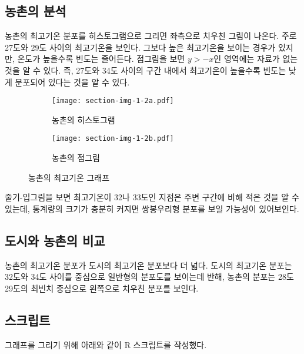 \subsection{농촌의 분석}

농촌의 최고기온 분포를 히스토그램으로 그리면 좌측으로 치우친 그림이 나온다.
주로 27도와 29도 사이의 최고기온을 보인다. 그보다 높은 최고기온을 보이는 경우가 있지만,
온도가 높을수록 빈도는 줄어든다. 점그림을 보면 $y > -x$인 영역에는 자료가 없는
것을 알 수 있다. 즉, 27도와 34도 사이의 구간 내에서 최고기온이 높을수록 빈도는 낮게
분포되어 있다는 것을 알 수 있다.

\begin{figure}[!hb]
  \begin{subfigure}{0.5\textwidth}
    \centering
    \texttt{[image: section-img-1-2a.pdf]}
    \caption{농촌의 히스토그램}
  \end{subfigure}
  \begin{subfigure}{0.5\textwidth}
    \centering
    \texttt{[image: section-img-1-2b.pdf]}
    \caption{농촌의 점그림}
  \end{subfigure}
  \caption{농촌의 최고기온 그래프}
\end{figure}


줄기-입그림을 보면 최고기온이 32나 33도인 지점은 주변 구간에 비해 적은 것을 알 수
있는데, 통계량의 크기가 충분히 커지면 쌍봉우리형 분포를 보일 가능성이 있어보인다.

\subsection{도시와 농촌의 비교}

농촌의 최고기온 분포가 도시의 최고기온 분포보다 더 넓다. 도시의 최고기온 분포는
32도와 34도 사이를 중심으로 일반형의 분포도를 보이는데 반해, 농촌의 분포는
28도 29도의 최빈치 중심으로 왼쪽으로 치우친 분포를 보인다.

\subsection{스크립트}
그래프를 그리기 위해 아래와 같이 R 스크립트를 작성했다.


